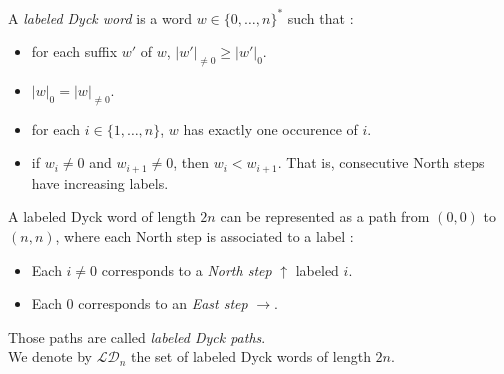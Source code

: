 \begin{definition}
    A \emph{labeled Dyck word} is a word $w \in 
    \{0, \ldots, n\}^*$ such that :
    \begin{itemize}
        \item for each suffix $w'$ of $w$,
            $|w'|_{\neq 0} \geqslant |w'|_0$.
        \item $|w|_0 = |w|_{\neq 0}$.
        \item for each $i \in \{1, \ldots, n\}$, $w$ has 
            exactly one occurence of $i$.
        \item if $w_i \neq 0$ and $w_{i+1} \neq 0$,
            then $w_i < w_{i+1}$. That is, consecutive
            North steps have increasing labels.
    \end{itemize}
    A labeled Dyck word of length $2n$ can be represented
    as a path from $(0,0)$ to $(n,n)$, where each North
    step is associated to a label :
    \begin{itemize}
        \item Each $i \neq 0$ corresponds to a
            \emph{North step} $\uparrow$ labeled $i$.
        \item Each $0$ corresponds to an
            \emph{East step} $\rightarrow$.
    \end{itemize}
    Those paths are called \emph{labeled Dyck paths}.\\
    We denote by $\mathcal{LD}_n$ the set of labeled
    Dyck words of length $2n$.
\end{definition}

